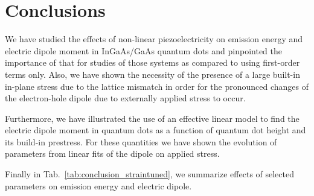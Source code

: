 %












\section{Conclusions}
We have studied the effects of non-linear piezoelectricity on emission energy and electric dipole moment in InGaAs/GaAs quantum dots and pinpointed the importance of that for studies of those systems as compared to using first-order terms only. 
Also, we have shown the necessity of the presence of a large built-in in-plane stress due to the lattice mismatch in order for the pronounced changes of the electron-hole dipole due to externally applied stress to occur. 

Furthermore, we have illustrated the use of an effective linear model to find the electric dipole moment in quantum dots as a function of quantum dot height and its build-in prestress. For these quantities we have shown the evolution of parameters from linear fits of the dipole on applied stress. 

Finally in Tab.~\ref{tab:conclusion_straintuned}, we summarize effects of selected parameters on emission energy and electric dipole.

